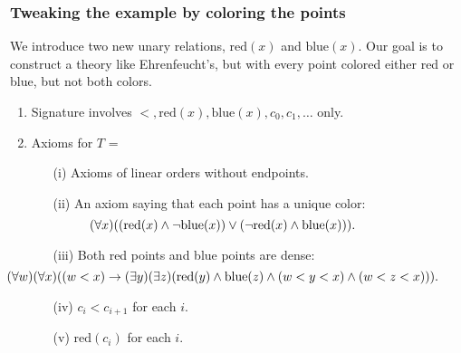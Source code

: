 \documentclass[t,xcolor=dvipsnames,handout]{beamer}
\theoremstyle{theoremFermat}
\theoremstyle{reimann}
\theoremstyle{ACExample}
\begin{document}
\begin{frame} 
  \frametitle{Tweaking the example by coloring the points}
  \pause
  We introduce two new unary relations, ${\textrm{red}}(x)$
  and ${\textrm{blue}}(x)$. \pause
  Our goal is to construct a theory like Ehrenfeucht's,
  but with every point colored either red or blue, but not both
  colors. \pause

\begin{enumerate}
\item Signature involves
  $<, {\textrm{red}}(x), {\textrm{blue}}(x),  c_0, c_1, \ldots$ only. \pause

\item Axioms for $T$ = \pause
\begin{enumerate}
\item[(i)] Axioms of linear orders without endpoints. \pause
\item[(ii)] An axiom saying that each point has a unique color: \pause
  \[
\hspace{-.8in}{(\forall x)(
  ({\textrm{red}}(x)\wedge \neg {\textrm{blue}}(x)) \vee
  (\neg {\textrm{red}}(x)\wedge {\textrm{blue}}(x))
  )}.
  \]
\pause
\vspace{-.2in}
\item[(iii)] Both red points and blue points are dense: \pause
\[
\hspace{-.8in}{(\forall w)(\forall x)
((w<x)\to (\exists y)(\exists z)({\textrm{red}}(y)\wedge {\textrm{blue}}(z)
\wedge (w<y<x)\wedge (w<z<x)))}.
\]
\pause
\vspace{-.2in}
\item[(iv)] $c_i < c_{i+1}$ for each $i$. \pause
\item[(v)] ${\textrm{red}}(c_i)$ for each $i$. \pause
\end{enumerate}
\end{enumerate}
\end{frame}
\end{document}
